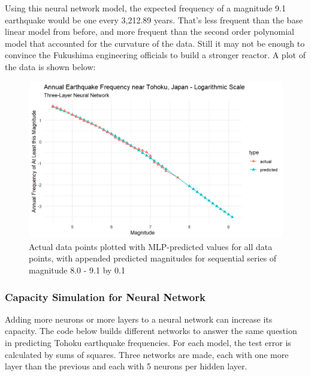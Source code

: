 Using this neural network model, the expected frequency of a magnitude
9.1 earthquake would be one every 3,212.89 years.  That's less frequent than the base linear model from before, and more frequent than the second order polynomial model that accounted for the curvature of the data.  Still it may not be enough to convince the Fukushima engineering officials to build a stronger reactor.  A plot of the data is shown below:

\begin{figure}[H]
    \center
    \includegraphics[width=0.8\linewidth]{Figures/tohoku_logscale_mlp.png}
    \caption{\footnotesize{Actual data points plotted with MLP-predicted values for all data points, with appended predicted magnitudes for sequential series of magnitude 8.0 - 9.1 by 0.1}}
    \label{tohoku_mlp}
\end{figure}


\subsubsection{Capacity Simulation for Neural Network}

Adding more neurons or more layers to a neural network can increase its capacity.  The code below builds different networks to answer the same question in predicting Tohoku earthquake frequencies.  For each model, the test error is calculated by sums of squares.  Three networks are made, each with one more layer than the previous and each with 5 neurons per hidden layer.


